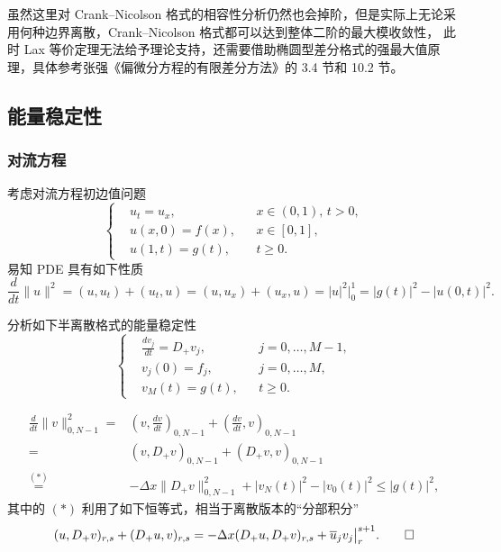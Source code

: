 \begin{remark}
    虽然这里对 Crank–Nicolson 格式的相容性分析仍然也会掉阶，但是实际上无论采用何种边界离散，Crank–Nicolson 格式都可以达到整体二阶的最大模收敛性，
    此时 Lax 等价定理无法给予理论支持，还需要借助椭圆型差分格式的强最大值原理，具体参考张强《偏微分方程的有限差分方法》的 3.4 节和 10.2 节。
\end{remark}


\subsection{能量稳定性}

\subsubsection{对流方程}

考虑对流方程初边值问题
\[
    \left\{
    \begin{aligned}
         & u_t = u_{x},   &  & x \in (0,1),\, t > 0, \\
         & u(x,0) = f(x), &  & x \in [0,1],          \\
         & u(1,t) = g(t), &  & t \ge 0.
    \end{aligned}
    \right.
\]
易知 PDE 具有如下性质
\[
    \frac{d}{dt}\|u\|^2 = (u,u_t) + (u_t,u) = (u,u_x) + (u_x,u)
    = |u|^2 \big|_0^1 = |g(t)|^2 - |u(0,t)|^2.
\]

\begin{example}
    分析如下半离散格式的能量稳定性
    \[
        \left\{
        \begin{aligned}
             & \frac{d v_j}{d t} = D_+ v_j, &  & j=0,\dots,M-1, \\
             & v_j(0) = f_j,                &  & j=0,\dots,M,   \\
             & v_M(t) = g(t),               &  & t \ge 0.
        \end{aligned}
        \right.
    \]
\end{example}

\begin{solution*}
    \begin{align*}
        \frac{d}{dt} \|v\|_{0,N-1}^2
        ={}                & \left( v,\frac{d v}{d t} \right)_{0,N-1} + \left( \frac{d v}{d t}, v\right)_{0,N-1} \\
        ={}                & \left( v,D_+ v \right)_{0,N-1} + \left( D_+ v, v\right)_{0,N-1}                     \\
        \overset{(*)}{=}{} & - \Delta x \|D_+ v\|_{0,N-1}^2 + |v_N(t)|^2 - |v_0(t)|^2 \le{}  |g(t)|^2,
    \end{align*}
    其中的 $(*)$ 利用了如下恒等式，相当于离散版本的“分部积分”
    \[
        (u,D_+ v)_{r,s} + (D_+ u, v)_{r,s} = -\Delta x (D_+ u, D_+ v)_{r,s} + \overline{u}_j v_j \big|_r^{s+1}. \qedhere
    \]
\end{solution*}

